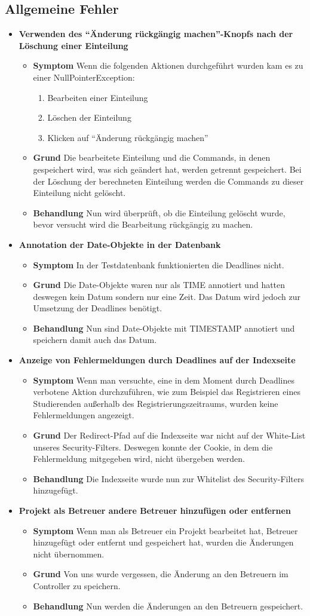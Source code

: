 \documentclass[parskip=full]{scrartcl}
\newcommand{\fehler}[4]{\textbf{#1}
 							\begin{itemize}
 							  \item \textbf{Symptom}  #2
 							  \item \textbf{Grund} #3
 							  \item \textbf{Behandlung} #4
 							\end{itemize}}
\newcommand{\code}[1]{{\ttfamily #1}}
\begin{document}
\subsection{Allgemeine Fehler}
\begin{itemize}
  \item \fehler{Verwenden des \enquote{Änderung rückgängig machen}-Knopfs nach
  der Löschung einer Einteilung }{Wenn die folgenden
  Aktionen durchgeführt wurden kam es zu einer \code{NullPointerException}:
\begin{enumerate}
  \item Bearbeiten einer Einteilung
  \item Löschen der Einteilung
  \item Klicken auf \enquote{Änderung rückgängig machen}
\end{enumerate}}{Die bearbeitete Einteilung und die Commands, in denen
gespeichert wird, was sich geändert hat, werden getrennt gespeichert. Bei der
Löschung der berechneten Einteilung werden die Commands zu dieser Einteilung
nicht gelöscht.}{Nun wird überprüft, ob die Einteilung gelöscht wurde, bevor
versucht wird die Bearbeitung rückgängig zu machen.}
\item \fehler{Annotation der Date-Objekte in der Datenbank }{In der %
Testdatenbank funktionierten die Deadlines nicht. }{Die Date-Objekte waren
nur als \code{TIME} annotiert und hatten deswegen kein Datum sondern nur eine Zeit.
Das Datum wird jedoch zur Umsetzung der Deadlines benötigt.}{Nun sind
Date-Objekte mit \code{TIMESTAMP} annotiert und speichern damit auch das Datum.}
\item \fehler{Anzeige von Fehlermeldungen durch Deadlines auf der
Indexseite}{Wenn man versuchte, eine in dem Moment durch Deadlines verbotene
Aktion durchzuführen, wie zum Beispiel das Registrieren eines Studierenden
außerhalb des Registrierungszeitraums, wurden keine Fehlermeldungen
angezeigt.}{Der Redirect-Pfad auf die Indexseite war nicht auf der White-List
unseres Security-Filters. Deswegen konnte der Cookie, in dem die Fehlermeldung 
mitgegeben wird, nicht übergeben werden. }{Die Indexseite wurde nun zur
Whitelist des Security-Filters hinzugefügt.}
\item \fehler{Projekt als Betreuer andere Betreuer hinzufügen
oder entfernen}{Wenn man als Betreuer ein Projekt bearbeitet hat, Betreuer
hinzugefügt oder entfernt und gespeichert hat, wurden die Änderungen nicht übernommen.}{Von uns wurde vergessen, die Änderung an den Betreuern im Controller zu speichern.}{Nun werden die Änderungen an den Betreuern gespeichert.}

\end{itemize}
\end{document}
